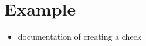\documentclass[11pt,a4paper]{article}
\begin{document}
\section{Example}
\begin{itemize}
	\item documentation of creating a check
\end{itemize}
\end{document}
